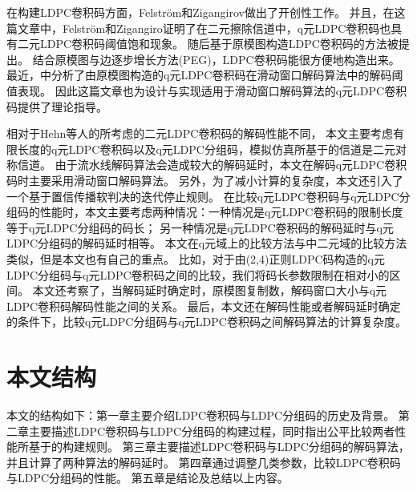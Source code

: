 在构建LDPC卷积码方面，Felström和Zigangirov做出了开创性工作\parencite{782171}。
并且，在这篇文章中，Felström和Zigangiro证明了在二元擦除信道中，q元LDPC卷积码也具有二元LDPC卷积码阈值饱和现象。
随后基于原模图\parencite{Thorpe2003Low}构造LDPC卷积码的方法被提出。
结合原模图与边逐步增长方法(PEG)\parencite{1377521}，LDPC卷积码能很方便地构造出来。
最近，\parencite{6874959}中分析了由原模图构造的q元LDPC卷积码在滑动窗口解码算法中的解码阈值表现。
因此这篇文章也为设计与实现适用于滑动窗口解码算法的q元LDPC卷积码提供了理论指导。

相对于Hehn等人的\parencite{5089507}所考虑的二元LDPC卷积码的解码性能不同，
本文主要考虑有限长度的q元LDPC卷积码以及q元LDPC分组码，模拟仿真所基于的信道是二元对称信道。
由于流水线解码算法会造成较大的解码延时，本文在解码q元LDPC卷积码时主要采用滑动窗口解码算法。
另外，为了减小计算的复杂度，本文还引入了一个基于置信传播软判决的迭代停止规则。
在比较q元LDPC卷积码与q元LDPC分组码的性能时，本文主要考虑两种情况：一种情况是q元LDPC卷积码的限制长度等于q元LDPC分组码的码长；
另一种情况是q元LDPC卷积码的解码延时与q元LDPC分组码的解码延时相等。
本文在q元域上的比较方法与\parencite{5089507}中二元域的比较方法类似，但是本文也有自己的重点。
比如，对于由(2,4)正则LDPC码构造的q元LDPC分组码与q元LDPC卷积码之间的比较，我们将码长参数限制在相对小的区间。
本文还考察了，当解码延时确定时，原模图复制数，解码窗口大小与q元LDPC卷积码解码性能之间的关系。
最后，本文还在解码性能或者解码延时确定的条件下，比较q元LDPC分组码与q元LDPC卷积码之间解码算法的计算复杂度。
\section{本文结构}
本文的结构如下：第一章主要介绍LDPC卷积码与LDPC分组码的历史及背景。
第二章主要描述LDPC卷积码与LDPC分组码的构建过程，同时指出公平比较两者性能所基于的构建规则。
第三章主要描述LDPC卷积码与LDPC分组码的解码算法，并且计算了两种算法的解码延时。
第四章通过调整几类参数，比较LDPC卷积码与LDPC分组码的性能。
第五章是结论及总结以上内容。